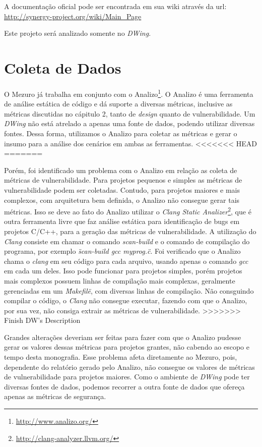 A documentação oficial pode ser encontrada em sua wiki através da url: \url{http://synergy-project.org/wiki/Main_Page}

Este projeto será analizado somente no \emph{DWing}.

\section{Coleta de Dados}
\label{data-colect}

O Mezuro já trabalha em conjunto com o Analizo\footnote{\url{http://www.analizo.org/}}. O Analizo é uma ferramenta de análise estática de código e dá suporte a diversas métricas, inclusive as métricas discutidas no cápitulo 2, tanto de \emph{design} quanto de vulnerabilidade. Um \emph{DWing} não está atrelado a apenas uma fonte de dados, podendo utilizar diversas fontes. Dessa forma, utilizamos o Analizo para coletar as métricas e gerar o insumo para a análise dos cenários em ambas as ferramentas.
<<<<<<< HEAD
=======

Porém, foi identificado um problema com o Analizo em relação as coleta de métricas de vulnerabilidade. Para projetos pequenos e simples as métricas de vulnerabilidade podem ser coletadas.  Contudo, para projetos maiores e mais complexos, com arquitetura bem definida, o Analizo não consegue gerar tais métricas. Isso se deve ao fato do Analizo utilizar o \emph{Clang Static Analizer}\footnote{\url{http://clang-analyzer.llvm.org/}}, que é outra ferramenta livre que faz análise estática para identificação de bugs em projetos C/C++, para a geração das métricas de vulnerabilidade. A utilização do \emph{Clang} consiste em chamar o comando \emph{scan-build}  e o comando de compilação do programa, por exemplo \emph{\"scan-build gcc myprog.c\"}. Foi verificado que o Analizo chama o \emph{clang} em seu código para cada arquivo, usando apenas o comando \emph{gcc} em cada um deles. Isso pode funcionar para projetos simples, porém projetos mais complexos possuem linhas de compilação mais complexas, geralmente gerenciadas em um \emph{\"Makefile\"}, com diversas linhas de compilação. Não consguindo compilar o código, o \emph{Clang} não consegue executar, fazendo com que o Analizo, por sua vez, não consiga extrair as métricas de vulnerabilidade. 
>>>>>>> Finish DW's Description

Grandes alterações deveriam ser feitas para fazer com que o Analizo pudesse gerar os valores dessas métricas para projetos grantes, não cabendo ao escopo e tempo desta monografia. Esse problema afeta diretamente ao Mezuro, pois, dependente do relatório gerado pelo Analizo, não consegue os valores de métricas de vulnerabilidade para projetos maiores. Como o ambiente de \emph{DWing} pode ter diversas fontes de dados, podemos recorrer a outra fonte de dados que ofereça apenas as métricas de segurança.

